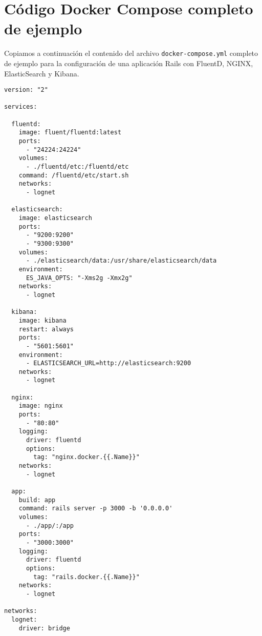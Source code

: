 \section{Código Docker Compose completo de ejemplo}
\label{anexo:C}

Copiamos a continuación el contenido del archivo \texttt{docker-compose.yml} completo de ejemplo para la configuración de una aplicación Rails con FluentD, NGINX, ElasticSearch y Kibana.

\begin{lstlisting}
version: "2"

services:

  fluentd:
    image: fluent/fluentd:latest
    ports:
      - "24224:24224"
    volumes:
      - ./fluentd/etc:/fluentd/etc
    command: /fluentd/etc/start.sh
    networks:
      - lognet

  elasticsearch:
    image: elasticsearch
    ports:
      - "9200:9200"
      - "9300:9300"
    volumes:
      - ./elasticsearch/data:/usr/share/elasticsearch/data
    environment:
      ES_JAVA_OPTS: "-Xms2g -Xmx2g"
    networks:
      - lognet

  kibana:
    image: kibana
    restart: always
    ports:
      - "5601:5601"
    environment:
      - ELASTICSEARCH_URL=http://elasticsearch:9200
    networks:
      - lognet

  nginx:
    image: nginx
    ports:
      - "80:80"
    logging:
      driver: fluentd
      options:
        tag: "nginx.docker.{{.Name}}"
    networks:
      - lognet

  app:
    build: app
    command: rails server -p 3000 -b '0.0.0.0'
    volumes:
      - ./app/:/app
    ports:
      - "3000:3000"
    logging:
      driver: fluentd
      options:
        tag: "rails.docker.{{.Name}}"
    networks:
      - lognet

networks:
  lognet:
    driver: bridge

\end{lstlisting}
